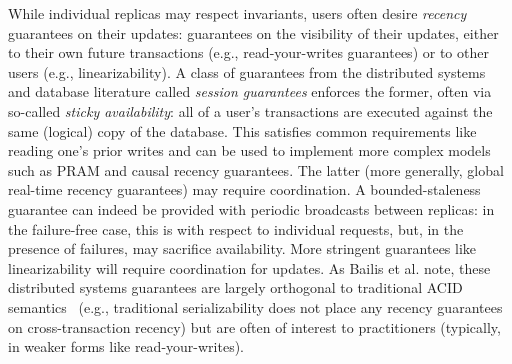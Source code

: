  While individual replicas may respect
invariants, users often desire \textit{recency} guarantees on their
updates: guarantees on the visibility of their updates, either to
their own future transactions (e.g., read-your-writes guarantees) or
to other users (e.g., linearizability). A class of guarantees from the
distributed systems and database literature called \textit{session
  guarantees} enforces the former, often via so-called \textit{sticky
  availability}: all of a user's transactions are executed against the
same (logical) copy of the database. This satisfies common
requirements like reading one's prior writes and can be used to
implement more complex models such as PRAM and causal recency
guarantees. The latter (more generally, global real-time recency
guarantees) may require coordination. A bounded-staleness guarantee
can indeed be provided with periodic broadcasts between replicas: in
the failure-free case, this is \cfree with respect to individual
requests, but, in the presence of failures, may sacrifice
availability. More stringent guarantees like linearizability will
require coordination for updates. As Bailis et al. note, these
distributed systems guarantees are largely orthogonal to traditional
ACID semantics~\cite{hat-vldb} (e.g., traditional serializability does
not place any recency guarantees on cross-transaction recency) but are
often of interest to practitioners (typically, in weaker forms like
read-your-writes).
